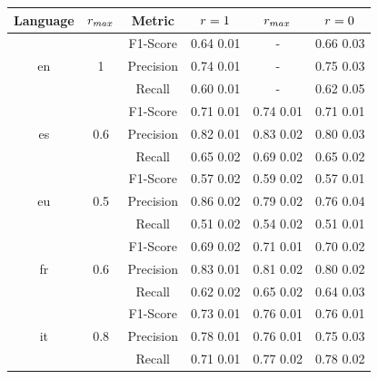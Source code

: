 \begin{tabular}{@{}cccccc@{}}%
\toprule%
Language&$r_{max}$&Metric&{$r=1$}&{$r_{max}$}&{$r=0$}\\%
\midrule%
\multirow{3}{*}{en}&\multirow{3}{*}{1}&F1-Score&0.64 \bm{$\pm$} 0.01&{-}&0.66 \bm{$\pm$} 0.03\\%
&&Precision&0.74 \bm{$\pm$} 0.01&{-}&0.75 \bm{$\pm$} 0.03\\%
&&Recall&0.60 \bm{$\pm$} 0.01&{-}&0.62 \bm{$\pm$} 0.05\\%
\midrule%
\multirow{3}{*}{es}&\multirow{3}{*}{0.6}&F1-Score&0.71 \bm{$\pm$} 0.01&0.74 \bm{$\pm$} 0.01&0.71 \bm{$\pm$} 0.01\\%
&&Precision&0.82 \bm{$\pm$} 0.01&0.83 \bm{$\pm$} 0.02&0.80 \bm{$\pm$} 0.03\\%
&&Recall&0.65 \bm{$\pm$} 0.02&0.69 \bm{$\pm$} 0.02&0.65 \bm{$\pm$} 0.02\\%
\midrule%
\multirow{3}{*}{eu}&\multirow{3}{*}{0.5}&F1-Score&0.57 \bm{$\pm$} 0.02&0.59 \bm{$\pm$} 0.02&0.57 \bm{$\pm$} 0.01\\%
&&Precision&0.86 \bm{$\pm$} 0.02&0.79 \bm{$\pm$} 0.02&0.76 \bm{$\pm$} 0.04\\%
&&Recall&0.51 \bm{$\pm$} 0.02&0.54 \bm{$\pm$} 0.02&0.51 \bm{$\pm$} 0.01\\%
\midrule%
\multirow{3}{*}{fr}&\multirow{3}{*}{0.6}&F1-Score&0.69 \bm{$\pm$} 0.02&0.71 \bm{$\pm$} 0.01&0.70 \bm{$\pm$} 0.02\\%
&&Precision&0.83 \bm{$\pm$} 0.01&0.81 \bm{$\pm$} 0.02&0.80 \bm{$\pm$} 0.02\\%
&&Recall&0.62 \bm{$\pm$} 0.02&0.65 \bm{$\pm$} 0.02&0.64 \bm{$\pm$} 0.03\\%
\midrule%
\multirow{3}{*}{it}&\multirow{3}{*}{0.8}&F1-Score&0.73 \bm{$\pm$} 0.01&0.76 \bm{$\pm$} 0.01&0.76 \bm{$\pm$} 0.01\\%
&&Precision&0.78 \bm{$\pm$} 0.01&0.76 \bm{$\pm$} 0.01&0.75 \bm{$\pm$} 0.03\\%
&&Recall&0.71 \bm{$\pm$} 0.01&0.77 \bm{$\pm$} 0.02&0.78 \bm{$\pm$} 0.02\\\bottomrule%
%
\end{tabular}
